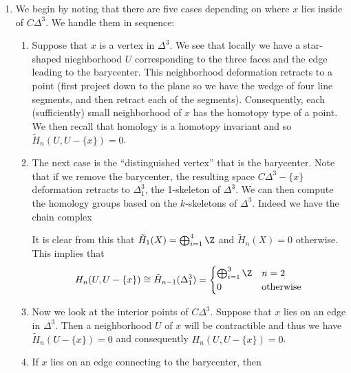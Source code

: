 \documentclass{article}
\begin{document}
\begin{solution}{\parindent}
  \begin{enumerate}
  \item We begin by noting that there are five cases depending on
    where $x$ lies inside of $C\Delta^3$. We handle them in sequence:
    \begin{enumerate}
    \item Suppose that $x$ is a vertex in $\Delta^3$. We see that
      locally we have a star-shaped nieghborhood $U$ corresponding to
      the three faces and the edge leading to the barycenter. This
      neighborhood deformation retracts to a point (first project down
      to the plane so we have the wedge of four line segments, and
      then retract each of the segments). Consequently, each
      (sufficiently) small neighborhood of $x$ has the homotopy type
      of a point. We then recall that homology is a homotopy invariant
      and so $\tilde{H}_n(U,U - \{x\}) = 0$.
    \item The next case is the ``distinguished vertex'' that is the
      barycenter. Note that if we remove the barycenter, the resulting
      space $C\Delta^3 - \{x\}$ deformation retracts to $\Delta^3_1$,
      the 1-skeleton of $\Delta^3$. We can then compute the homology
      groups based on the $k$-skeletons of $\Delta^3$. Indeed we have
      the chain complex
      \begin{center}
      \end{center}
      It is clear from this that $\tilde{H}_1(X) = \bigoplus_{i=1}^4
      \Z$ and $\tilde{H}_n(X) = 0$ otherwise. This implies that
      \[
      H_n(U, U-\{x\}) \cong \tilde{H}_{n-1}(\Delta^3_1) =
      \begin{cases}
        \bigoplus_{i=1}^3 \Z & n = 2 \\
        0 & \text{otherwise}
      \end{cases}
      \]
    \item Now we look at the interior points of $C\Delta^3$. Suppose
      that $x$ lies on an edge in $\Delta^3$. Then a neighborhood $U$
      of $x$ will be contractible and thus we have $\tilde{H}_n(U -
      \{x\}) = 0$ and consequently $H_n(U, U - \{x\}) = 0$.
    \item If $x$ lies on an edge connecting to the barycenter, then

\end{enumerate}
\end{enumerate}
\end{solution}
\end{document}
